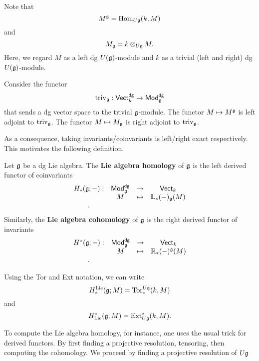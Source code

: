 \documentclass[11pt]{amsart}
\def\dgVect{{\sf Vect}^{\sf dg}}
\def\dgMod{{\sf Mod}^{\sf dg}}
\begin{document}
\begin{rmk}
Note that 
\[
M^\mathfrak g = {\rm Hom}_{U \mathfrak g}(k, M)
\]
and 
\[
M_\mathfrak g = k \otimes_{U \mathfrak g} M .
\] 
Here, we regard $M$ as a left dg $U(\mathfrak g)$-module and $k$ as a trivial (left and right) dg $U(\mathfrak g)$-module. 
\end{rmk}

\begin{lem}
Consider the functor
\[
{\rm triv}_\fg : \dgVect_k \to \dgMod_\fg
\]
that sends a dg vector space to the trivial $\mathfrak g$-module.
The functor $M \mapsto M^\mathfrak g$ is left adjoint to ${\rm triv}_\mathfrak g$. 
The functor $M \mapsto M_\mathfrak g$ is right adjoint to ${\rm triv}_\mathfrak g$. 
\end{lem}

As a consequence, taking invariants/coinvariants is left/right exact respectively. 
This motivates the following definition. 

\begin{dfn}
Let $\mathfrak g$ be a dg Lie algebra.
The {\bf Lie algebra homology} of $\mathfrak g$ is the left derived functor of coinvariants
\[
\begin{array}{cccc}
H_*(\fg ; -) : & \dgMod_\fg & \to & \Vect_k \\ 
& M & \mapsto & \LL_*(-)_\fg (M) \\ .
\end{array}
\]
Similarly, the {\bf Lie algebra cohomology} of $\mathfrak g$ is the right derived functor of invariants
\[
\begin{array}{cccc}
H^*(\fg ; -) : & \dgMod_\fg & \to & \Vect_k \\ 
& M & \mapsto & \RR_*(-)^\fg (M) \\ .
\end{array}
\]
\end{dfn}

\begin{rmk}
Using the Tor and Ext notation, we can write
\[
H^{\rm Lie}_*(\mathfrak g ; M) = {\rm Tor}^{U \mathfrak g}_* (k, M)
\]
and 
\[
H_{\rm Lie}^*(\mathfrak g ; M) = {\rm Ext}^*_{U \mathfrak g}(k, M) .
\] 
\end{rmk}

To compute the Lie algebra homology, for instance, one uses the usual trick for derived functors. 
By first finding a projective resolution, tensoring, then computing the cohomology. 
We proceed by finding a projective resolution of $U\mathfrak g$

\subsubsection{}
\end{document}

